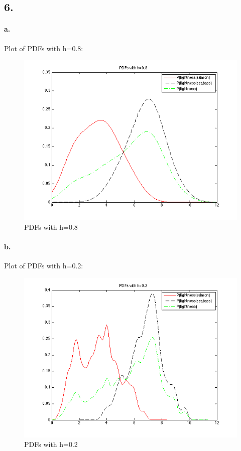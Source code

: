 \documentclass[a4paper]{article}
\begin{document}
\subsection*{6.}
\paragraph{a.} Plot of PDFs with h=0.8: \\

\begin{figure}[H]
  \centering
    \includegraphics[scale=.57]{images/6_a.png}
  \caption{PDFs with h=0.8}
\end{figure}

\paragraph{b.} Plot of PDFs with h=0.2: \\

\begin{figure}[H]
  \centering
    \includegraphics[scale=.57]{images/6_b.png}
  \caption{PDFs with h=0.2}
\end{figure}
\end{document}
